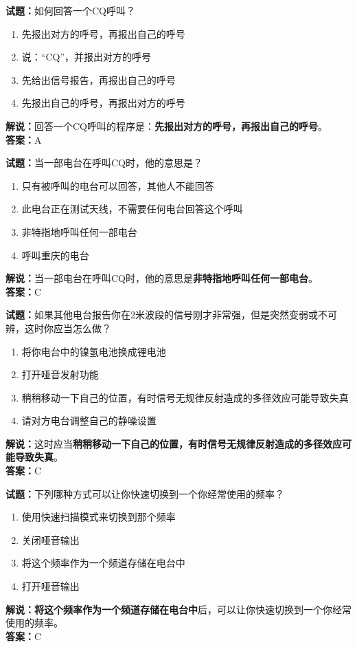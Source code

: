 \documentclass{ctexbook}
\begin{document}
\vspace{1em}

\textbf{试题：}如何回答一个CQ呼叫？
\begin{enumerate}[leftmargin=3em]
  \item 先报出对方的呼号，再报出自己的呼号
  \item 说：“CQ”，并报出对方的呼号
  \item 先给出信号报告，再报出自己的呼号
  \item 先报出自己的呼号，再报出对方的呼号
\end{enumerate}
\noindent\textbf{解说：}回答一个CQ呼叫的程序是：\textbf{先报出对方的呼号，再报出自己的呼号}。\\\noindent\textbf{答案：}A

\vspace{1em}

\textbf{试题：}当一部电台在呼叫CQ时，他的意思是？
\begin{enumerate}[leftmargin=3em]
  \item 只有被呼叫的电台可以回答，其他人不能回答
  \item 此电台正在测试天线，不需要任何电台回答这个呼叫
  \item 非特指地呼叫任何一部电台
  \item 呼叫重庆的电台
\end{enumerate}
\noindent\textbf{解说：}当一部电台在呼叫CQ时，他的意思是\textbf{非特指地呼叫任何一部电台}。\\\noindent\textbf{答案：}C

\vspace{1em}

\textbf{试题：}如果其他电台报告你在2米波段的信号刚才非常强，但是突然变弱或不可辨，这时你应当怎么做？
\begin{enumerate}[leftmargin=3em]
  \item 将你电台中的镍氢电池换成锂电池
  \item 打开哑音发射功能
  \item 稍稍移动一下自己的位置，有时信号无规律反射造成的多径效应可能导致失真
  \item 请对方电台调整自己的静噪设置
\end{enumerate}
\noindent\textbf{解说：}这时应当\textbf{稍稍移动一下自己的位置，有时信号无规律反射造成的多径效应可能导致失真}。\\\noindent\textbf{答案：}C

\vspace{1em}

\textbf{试题：}下列哪种方式可以让你快速切换到一个你经常使用的频率？
\begin{enumerate}[leftmargin=3em]
  \item 使用快速扫描模式来切换到那个频率
  \item 关闭哑音输出
  \item 将这个频率作为一个频道存储在电台中
  \item 打开哑音输出
\end{enumerate}
\noindent\textbf{解说：}\textbf{将这个频率作为一个频道存储在电台中}后，可以让你快速切换到一个你经常使用的频率。\\\noindent\textbf{答案：}C
\end{document}
